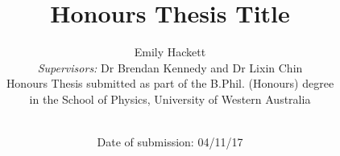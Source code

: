 \begin{titlepage}
\title{Honours Thesis Title}
\author{Emily Hackett \\
{{\it Supervisors:} Dr Brendan Kennedy and Dr Lixin Chin}\\
{Honours Thesis submitted as part of the B.Phil. (Honours) degree} \\ {in the School of Physics, University of Western Australia}\\ \\}
\date{Date of submission: 04/11/17}
\maketitle
\end{titlepage}
